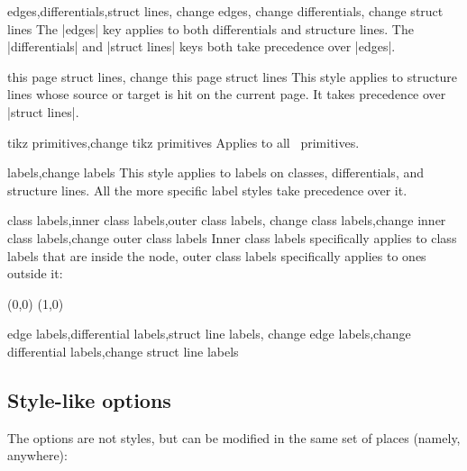 \begin{sseqdata}[name = basic, cohomological Serre grading]
\begin{stylekeylist}{edges,differentials,struct lines, change edges, change differentials, change struct lines}
The |edges| key applies to both differentials and structure lines. The |differentials| and |struct lines| keys both take precedence over |edges|.
\end{stylekeylist}

\begin{stylekeylist}{this page struct lines, change this page struct lines}
This style applies to structure lines whose source or target is hit on the current page. It takes precedence over |struct lines|.
\end{stylekeylist}

\begin{stylekeylist}{tikz primitives,change tikz primitives}
Applies to all \tikzpkg\  primitives.
\end{stylekeylist}


\begin{stylekeylist}{labels,change labels}
This style applies to labels on classes, differentials, and structure lines. All the more specific label styles take precedence over it.
\end{stylekeylist}

\begin{stylekeylist}{class labels,inner class labels,outer class labels,
                change class labels,change inner class labels,change outer class labels}
Inner class labels specifically applies to class labels that are inside the node, outer class labels specifically applies to ones outside it:
\begin{codeexample}[]
\begin{sseqpage}[ no axes, classes = { inner sep = 1pt },
    label distance = 2pt,
    outer class labels = { red },
    inner class labels = { blue } ]
\class["a", "b" above](0,0)
\class["a", "c" right](1,0)
\end{sseqpage}
\end{codeexample}
\end{stylekeylist}

\begin{stylekeylist}{edge labels,differential labels,struct line labels,
                change edge labels,change differential labels,change struct line labels}

\end{stylekeylist}


\subsection{Style-like options}
The options are not styles, but can be modified in the same set of places (namely, anywhere):


\end{sseqdata}
